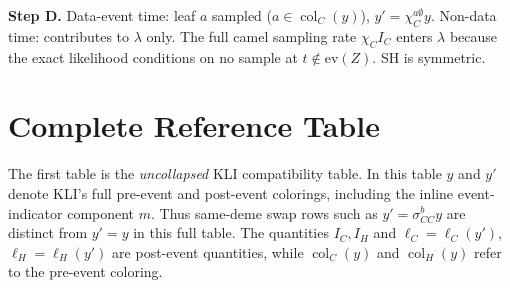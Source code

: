 \documentclass[11pt]{article}
\newcommand{\col}{\operatorname{col}}
\newcommand{\evZ}{\mathrm{ev}(Z)}
\theoremstyle{plain}
\begin{document}
\textbf{Step D.} Data-event time: leaf $a$ sampled ($a\in\col_C(y)$), $y'=\chi^{a\emptyset}_C y$.
Non-data time: contributes to $\lambda$ only. The full camel sampling rate $\chi_C I_C$ enters
$\lambda$ because the exact likelihood conditions on no sample at $t\notin\evZ$. SH is symmetric.

\section{Complete Reference Table}
The first table is the \emph{uncollapsed} KLI compatibility table. In this table $y$ and $y'$
denote KLI's full pre-event and post-event colorings, including the inline event-indicator
component $m$. Thus same-deme swap rows such as $y'=\sigma^b_{CC}y$ are distinct from $y'=y$ in this
full table. The quantities $I_C,I_H$ and $\ell_C=\ell_C(y')$, $\ell_H=\ell_H(y')$ are post-event
quantities, while $\col_C(y)$ and $\col_H(y)$ refer to the pre-event coloring.
\end{document}
